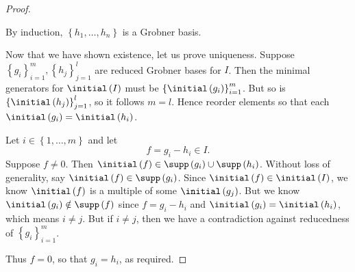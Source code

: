 \documentclass[co439]{subfiles}
\begin{document}
\begin{proof}
\begin{claim}
            By induction, $\left\lbrace h_1,\ldots,h_n \right\rbrace$ is a Grobner basis.
        \end{claim}

        Now that we have shown existence, let us prove uniqueness. Suppose $\left\lbrace g_i \right\rbrace^{m}_{i=1}, \left\lbrace h_j \right\rbrace^{l}_{j=1}$ are reduced Grobner bases for $I$. Then the minimal generators for $\initial\left( I \right)$ must be $\left\lbrace \initial\left( g_i \right) \right\rbrace^{m}_{i=1}$. But so is $\left\lbrace \initial\left( h_j \right) \right\rbrace^{l}_{j=1}$, so it follows $m=l$. Hence reorder elements so that each $\initial\left( g_i \right) = \initial\left( h_i \right)$.

        Let $i\in\left\lbrace 1,\ldots,m \right\rbrace$ and let
        \begin{equation*}
            f = g_i-h_i\in I.
        \end{equation*}
        Suppose $f\neq 0$. Then $\initial\left( f \right)\in\supp\left( g_i \right)\cup\supp\left( h_i \right)$. Without loss of generality, say $\initial\left( f \right)\in\supp\left( g_i \right)$. Since $\initial\left( f \right)\in\initial\left( I \right)$, we know $\initial\left( f \right)$ is a multiple of some $\initial\left( g_j \right)$. But we know $\initial\left( g_i \right)\notin\supp\left( f \right)$ since $f=g_i-h_i$ and $\initial\left( g_i \right)=\initial\left( h_i \right)$, which means $i\neq j$. But if $i\neq j$, then we have a contradiction against reducedness of $\left\lbrace g_i \right\rbrace^{m}_{i=1}$. 

        Thus $f=0$, so that $g_i=h_i$, as required.
    \end{proof}
    
    
    
    
    
    
    
    
    
    
    
    
    
    
    
    
    
\end{document}
